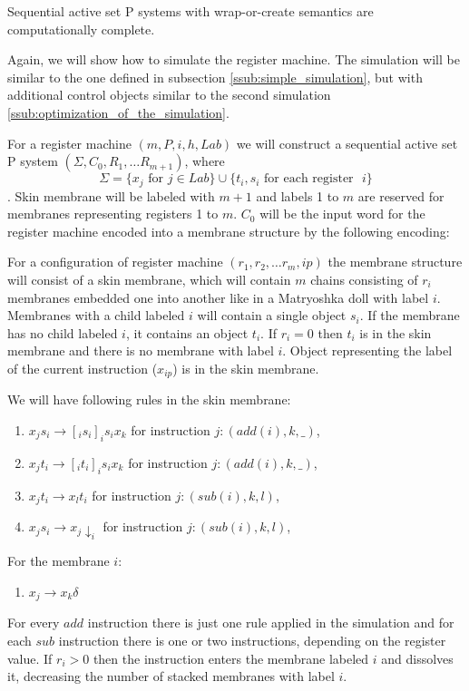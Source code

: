
    \begin{veta}
      Sequential active set P systems with wrap-or-create semantics are computationally complete.
    \end{veta}

    \begin{dokaz}
      Again, we will show how to simulate the register machine. The simulation will be similar to the one defined in subsection \ref{ssub:simple_simulation}, but with additional control objects similar to the second simulation \ref{ssub:optimization_of_the_simulation}.

      For a register machine $(m,P,i,h,Lab)$ we will construct a sequential active set P system $(\Sigma, C_0, R_1, \ldots R_{m+1})$, where $$\Sigma = \{x_j \text{~for~} j\in Lab\}\cup\{t_i, s_i \text{~for each register ~}i\}$$. Skin membrane will be labeled with $m+1$ and labels 1 to $m$ are reserved for membranes representing registers 1 to $m$. $C_0$ will be the input word for the register machine encoded into a membrane structure by the following encoding: 

      For a configuration of register machine $(r_1, r_2, \ldots r_m, ip)$ the membrane structure will consist of a skin membrane, which will contain $m$ chains consisting of $r_i$ membranes embedded one into another like in a Matryoshka doll with label $i$. Membranes with a child labeled $i$ will contain a single object $s_i$. If the membrane has no child labeled $i$, it contains an object $t_i$. If $r_i = 0$ then $t_i$ is in the skin membrane and there is no membrane with label $i$. Object representing the label of the current instruction ($x_{ip}$) is in the skin membrane.

      We will have following rules in the skin membrane:
      \begin{enumerate}
        \item\label{wrap_skin_add_s} $x_j s_i\rightarrow [_i s_i ]_i s_i x_k$ for instruction $j: (add(i), k, \_)$,
        \item\label{wrap_skin_add_t} $x_j t_i\rightarrow [_i t_i ]_i s_i x_k$ for instruction $j: (add(i), k, \_)$,
        \item\label{wrap_skin_sub_t} $x_j t_i\rightarrow x_l t_i$ for instruction $j: (sub(i), k, l)$,
        \item\label{wrap_skin_sub_s} $x_j s_i\rightarrow x_j\downarrow_i$ for instruction $j: (sub(i), k, l)$,
      \end{enumerate}

      For the membrane $i$:
      \begin{enumerate}[resume]
        \item\label{wrap_inner_dissolve} $x_j \rightarrow x_k\delta$
      \end{enumerate}

      For every $add$ instruction there is just one rule applied in the simulation and for each $sub$ instruction there is one or two instructions, depending on the register value. If $r_i>0$ then the instruction enters the membrane labeled $i$ and dissolves it, decreasing the number of stacked membranes with label $i$.
    \end{dokaz}

